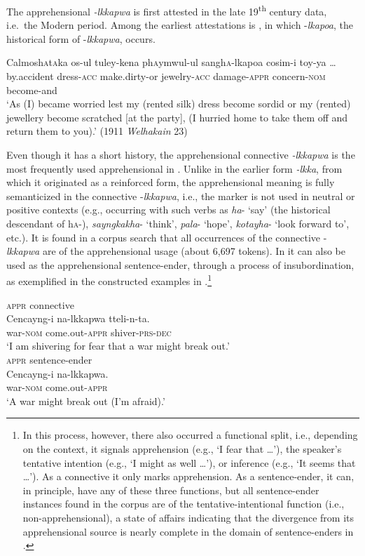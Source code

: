 \documentclass[output=paper,colorlinks,citecolor=brown]{langscibook}
\begin{document}
The apprehensional \textit{-lkkapwa} is first attested in the late 19\textsuperscript{th} century data, i.e.\  the Modern  period. Among the earliest attestations is , in which \nobreakdash-\textit{lkapoa}, the historical form of \nobreakdash-\textit{lkkapwa}, occurs.


\ea \label{ex:RK5}
\gll Calmosh\textsc{a}t\textsc{a}ka os-ul tuley-kena ph\textsc{a}ymwul-ul sangh\textsc{a}-lkapoa cosim-i toy-ya … \\
by.accident dress-\textsc{acc} make.dirty-or jewelry-\textsc{acc} damage-\textsc{appr} concern-\textsc{nom} become-and \\
\glt `As (I) became worried lest my (rented silk) dress become sordid or my (rented) jewellery become scratched [at the party], (I hurried home to take them off and return them to you).' (1911 \textit{Welhakain} 23)
\z


\noindent Even though it has a short history, the apprehensional connective \textit{-lkkapwa} is the most frequently used apprehensional in . Unlike in the earlier form \textit{\nobreakdash-lkka}, from which it originated as a reinforced form, the apprehensional meaning is fully semanticized in the connective \nobreakdash-\textit{lkkapwa}, i.e., the marker is not used in neutral or positive contexts (e.g., occurring with such verbs as \textit{ha}- `say' (the historical descendant of h\textsc{a}-), \textit{sayngkakha}- `think', \textit{pala}- `hope', \textit{kotayha}- `look forward to', etc.). It is found in a corpus search that all occurrences of the connective \nobreakdash-\textit{lkkapwa} are of the apprehensional usage (about 6,697 tokens). In  it can also be used as the apprehensional sentence-ender, through a process of insubordination, as exemplified in the constructed examples in .\footnote{In this process, however, there also occurred a functional split, i.e., depending on the context, it signals apprehension (e.g., `I fear that …'), the speaker's tentative intention (e.g., `I might as well …'), or inference (e.g., `It seems that …'). As a connective it only marks apprehension. As a sentence-ender, it can, in principle, have any of these three functions, but all sentence-ender instances found in the corpus are of the tentative-intentional function (i.e., non-apprehensional), a state of affairs indicating that the divergence from its apprehensional source is nearly complete in the domain of sentence-enders in .}


\ea \label{ex:RK6}
\ea \label{ex:RK6a} \textnormal{\textsc{appr} connective} \\
\gll Cencayng-i na-lkkapwa tteli-n-ta. \\
war-\textsc{nom} come.out-\textsc{appr} shiver-\textsc{prs-dec} \\
\glt `I am shivering for fear that a war might break out.' \\
\ex \label{ex:RK6b} \textnormal{\textsc{appr} sentence-ender} \\
\gll Cencayng-i na-lkkapwa. \\
war-\textsc{nom} come.out-\textsc{appr} \\
\glt `A war might break out (I'm afraid).'
\z
\z
\end{document}
